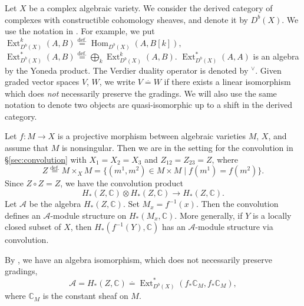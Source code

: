 \documentclass[12pt]{amsart}
\def\Bbb{\mathbb}
\theoremstyle{definition}
\theoremstyle{remark}
\numberwithin{equation}{subsection}
\newcommand{\secref}[1]{\S\ref{#1}}
\newcommand{\defeq}{\overset{\operatorname{\scriptstyle def.}}{=}}
\newcommand{\C}{{\Bbb C}}
\newcommand{\Hom}{\operatorname{Hom}}
\newcommand{\Ext}{\operatorname{Ext}}
\newcommand{\ngpiso}{\overset{.}{=}}
\begin{document}
Let $X$ be a complex algebraic variety. We consider the derived
category of complexes with constructible cohomology sheaves, and
denote it by $D^b(X)$.  We use the notation in \cite{Gi-book}. For
example, we put
\(
   \Ext^k_{D^b(X)} (A, B) \defeq \Hom_{D^b(X)}(A, B[k]),
\)
\(
    \Ext^*_{D^b(X)}(A,B) \defeq \bigoplus_k \Ext^k_{D^b(X)}(A,B).
\)
$\Ext^*_{D^b(X)}(A,A)$ is an algebra by the Yoneda product.
%
The Verdier duality operator is denoted by ${}^\vee$.
%
Given graded vector spaces $V$, $W$, we write $V\ngpiso W$ if there
exists a linear isomorphism which does {\it not\/} necessarily
preserve the gradings. We will also use the same notation to denote
two objects are quasi-isomorphic up to a shift in the derived category.

Let $f\colon M\to X$ is a projective morphism between algebraic
varieties $M$, $X$, and assume that $M$ is nonsingular. Then we are in
the setting for the convolution in \secref{sec:convolution} with
$X_1 = X_2 = X_3$ and $Z_{12} = Z_{23} = Z$, where
\begin{equation*}
   Z \defeq M\times_X M 
   = \{ (m^1, m^2)\in M\times M\mid f(m^1) = f(m^2) \}.
\end{equation*}
Since $Z\circ Z = Z$, we have the convolution product
\begin{equation*}
   H_*(Z,\C)\otimes H_*(Z,\C) \to H_*(Z,\C).  
\end{equation*}
Let $\mathcal A$ be the algebra $H_*(Z,\C)$.
Set $M_x = f^{-1}(x)$. Then the convolution defines an
$\mathcal A$-module structure on $H_*(M_x,\C)$.
More generally, if $Y$ is a locally closed subset of $X$, then 
$H_*(f^{-1}(Y),\C)$ has an $\mathcal A$-module structure via
convolution.

By \cite[8.6.7]{Gi-book}, we have an algebra isomorphism, which does not
necessarily preserve gradings,
\begin{equation*}
   \mathcal A = H_*(Z,\C)
   \ngpiso \Ext^*_{D^b(X)}(f_*\C_M, f_*\C_M),
\end{equation*}
where $\C_M$ is the constant sheaf on $M$.
\end{document}
